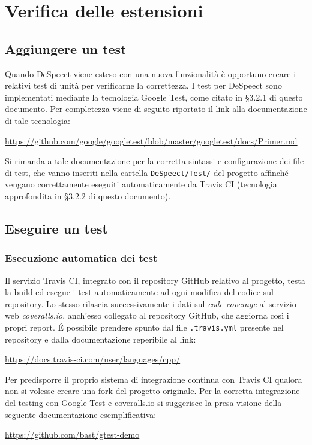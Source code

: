 \documentclass[openany,12pt,a4paper]{report}
\begin{document}
	\chapter{Verifica delle estensioni}
	
	\section{Aggiungere un test}
	
	Quando DeSpeect viene esteso con una nuova funzionalità è opportuno creare i relativi test di unità per verificarne la correttezza. I test per DeSpeect sono implementati mediante la tecnologia Google Test, come citato in §3.2.1 di questo documento. Per completezza viene di seguito riportato il link alla documentazione di tale tecnologia:
	\begin{center}
		\url{https://github.com/google/googletest/blob/master/googletest/docs/Primer.md}
	\end{center}
	Si rimanda a tale documentazione per la corretta sintassi e configurazione dei file di test, che vanno inseriti nella cartella \verb|DeSpeect/Test/| del progetto affinché vengano correttamente eseguiti automaticamente da Travis CI (tecnologia approfondita in §3.2.2 di questo documento). 
	
	\section{Eseguire un test}
	
	\subsection{Esecuzione automatica dei test}
	Il servizio Travis CI, integrato con il repository GitHub relativo al progetto, testa la build ed esegue i test automaticamente ad ogni modifica del codice sul repository. Lo stesso rilascia successivamente i dati sul \textit{code coverage} al servizio web \textit{coveralls.io}, anch'esso collegato al repository GitHub, che aggiorna così i propri report. É possibile prendere spunto dal file \verb|.travis.yml| presente nel repository e dalla documentazione reperibile al link:
	\begin{center}
		\url{https://docs.travis-ci.com/user/languages/cpp/}
	\end{center}
	Per predisporre il proprio sistema di integrazione continua con Travis CI qualora non si volesse creare una fork del progetto originale. Per la corretta integrazione del testing con Google Test e coveralls.io si suggerisce la presa visione della seguente documentazione esemplificativa:
	\begin{center}
		\url{https://github.com/bast/gtest-demo}
	\end{center} 
	
\end{document}
